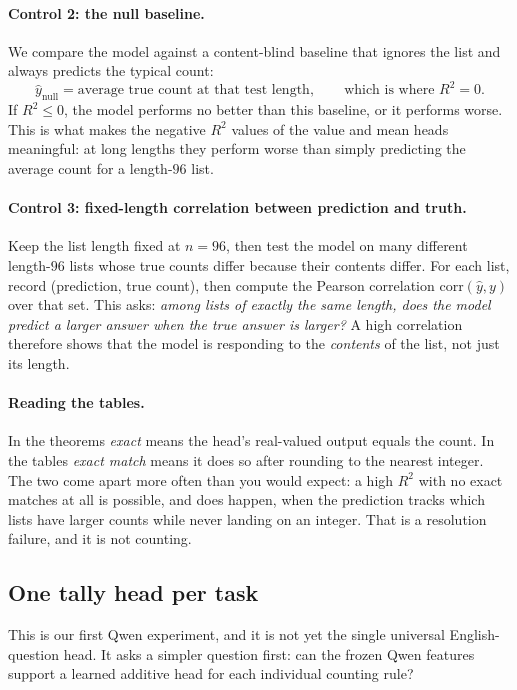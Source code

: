 \documentclass[10pt]{article}
\theoremstyle{definition}
\newcommand{\corr}{\mathrm{corr}}
\begin{document}
\paragraph{Control 2: the null baseline.}
We compare the model against a content-blind baseline that ignores the list
and always predicts the typical count:
\[
\hat{y}_{\text{null}} = \text{average true count at that test length},
\qquad\text{which is where } R^2 = 0 .
\]
If $R^2 \leq 0$, the model performs no better than this baseline, or it
performs worse. This is what makes the negative $R^2$ values of the value and
mean heads meaningful: at long lengths they perform worse than simply
predicting the average count for a length-$96$ list.

\paragraph{Control 3: fixed-length correlation between prediction and truth.}
Keep the list length fixed at $n = 96$, then test the model on many
different length-$96$ lists whose true counts differ because their
contents differ. For each list, record (prediction, true count), then
compute the Pearson correlation $\corr(\hat{y}, y)$ over that set. This asks:
\emph{among lists of exactly the same length, does the model predict a
larger answer when the true answer is larger?} A high correlation
therefore shows that the model is responding to the \emph{contents} of the
list, not just its length.

\paragraph{Reading the tables.} In the theorems \emph{exact} means the
head's real-valued output equals the count. In the tables \emph{exact
match} means it does so after rounding to the nearest integer. The two come
apart more often than you would expect: a high $R^2$ with no exact matches
at all is possible, and does happen, when the prediction tracks which lists
have larger counts while never landing on an integer. That is a resolution
failure, and it is not counting.

\subsection{One tally head per task}
\label{sec:per-task}

This is our first Qwen experiment, and it is not yet the single universal
English-question head. It asks a simpler question first: can the frozen
Qwen features support a learned additive head for each individual counting
rule?
\end{document}
